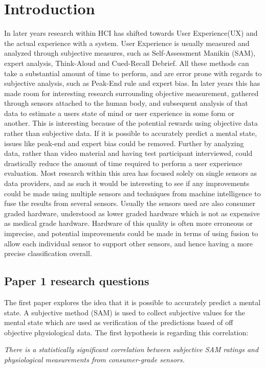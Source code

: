 \chapter{Introduction}
In later years research within HCI has shifted towards User Experience(UX) and the actual experience with a system.
User Experience is usually measured and analyzed through subjective measures, such as Self-Assessment Manikin (SAM), expert analysis, Think-Aloud and Cued-Recall Debrief. 
All these methods can take a substantial amount of time to perform, and are error prone with regards to subjective analysis, such as Peak-End rule and expert bias.
In later years this has made room for interesting research surrounding objective measurement, gathered through sensors attached to the human body, and subsequent analysis of that data to estimate a users state of mind or user experience in some form or another. 
This is interesting because of the potential rewards using objective data rather than subjective data. 
If it is possible to accurately predict a mental state, issues like peak-end and expert bias could be removed. 
Further by analyzing data, rather than video material and having test participant interviewed, could drastically reduce the amount of time required to perform a user experience evaluation. 
Most research within this area has focused solely on single sensors as data providers, and as such it would be interesting to see if any improvements could be made using multiple sensors and techniques from machine intelligence to fuse the results from several sensors. 
Usually the sensors used are also consumer graded hardware, understood as lower graded hardware which is not as expensive as medical grade hardware. 
Hardware of this quality is often more erroneous or imprecise, and potential improvements could be made in terms of using fusion to allow each individual sensor to support other sensors, and hence having a more precise classification overall.

\section{Paper 1 research questions}
The first paper explores the idea that it is possible to accurately predict a mental state. A subjective method (SAM) is used to collect subjective values for the mental state which are used as verification of the predictions based of off objective physiological data. The first hypothesis is regarding this correlation:

\textit{There is a statistically significant correlation between subjective SAM ratings and physiological measurements from consumer-grade sensors.}\\\\

